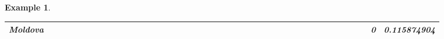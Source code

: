 \documentclass[a4paper,11pt]{report}
\newtheorem{example}[theorem]{Example}
\begin{document}
\begin{example}
\begin{appendices}
\begin{landscape}
\begin{longtable}{r|r|r|r|r|r|r|r|r|r|r|r|r|r|r|r|r|r|r|r|r|r|r|r|r|r|r|r|r|r|r|r|r|r|r|r|r|r|r|r|r|r|}
\multicolumn{1}{|r|}{\textbf{Moldova}}         &                                       &                                       &                                       &                                          &                                       &                                       &                                       &                                       &                                                &                                       &                                      &                                       &                                       &                                      &                                       &                                       &                                       &                                      &                                     &                                      &                                         &                                     &                                       &                                          &                                      &                                      &                                        &                                       &                                      &                                          &                                        &                                     &                                      &                                           &                                               &                                       &                                              &                                      &                                     & 0                                             & 0.115874904                             \\ \hline

\end{longtable}
\end{landscape}
\end{appendices}
\end{example}
\end{document}
